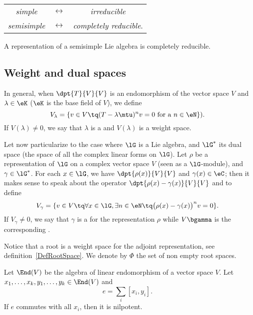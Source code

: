 \begin{center}
\begin{tabular}{ccc}
\emph{simple} & $\leftrightarrow$ & \emph{irreducible} \\
\emph{semisimple}& $\leftrightarrow$ &\emph{completely reducible}.\\
\end{tabular}
\end{center}

\begin{theorem}
A representation of a semisimple Lie algebra is completely reducible.
\end{theorem}

\subsection{Weight and dual spaces}

In general, when $\dpt{T}{V}{V}$ is an endomorphism of the vector space $V$ and $\lambda\in\eK$ ($\eK$ is the base field of $V$), we define
\begin{equation}
V_\lambda=\{ v\in V\tq (T-\lambda\mtu)^nv=0\textrm{ for a $n\in\eN$} \}).
\end{equation}
If $V(\lambda)\neq0$, we say that $\lambda$ is a  and $V(\lambda)$ is a weight space.

Let now particularize to the case where $\lG$ is a Lie algebra, and $\lG^*$ its dual space (the space of all the complex linear forms on $\lG$). Let $\rho$ be a representation of $\lG$ on a complex vector space $V$ (seen as a $\lG$-module), and $\gamma\in\lG^*$. For each $x\in\lG$, we have $\dpt{\rho(x)}{V}{V}$ and $\gamma(x)\in\eC$; then it makes sense to speak about the operator $\dpt{\rho(x)-\gamma(x)}{V}{V}$ and to define
\begin{equation}
V_{\gamma}=\{ v\in V\tq\forall x\in\lG,\exists n\in\eN \tq\big(\rho(x)-\gamma(x)\big)^nv=0 \}.
\end{equation}
If $V_{\gamma}\neq 0$, we say that $\gamma$ is a  for the representation $\rho$ while $V\bgamma$ is the corresponding .

Notice that a root is a weight space for the adjoint representation, see definition~\ref{DefRootSpace}. We denote by $\Phi$ the set of non empty root spaces.

\begin{lemma}

Let $\End(V)$ be the algebra of linear endomorphism of a vector space $V$. Let $x_1,\ldots,x_k,y_1,\ldots,y_k\in\End(V)$ and
\[
    e=\sum_i[x_i,y_i].
\]
If $e$ commutes with all $x_i$, then it is nilpotent.
\label{lem:EndV_e}
\end{lemma}


